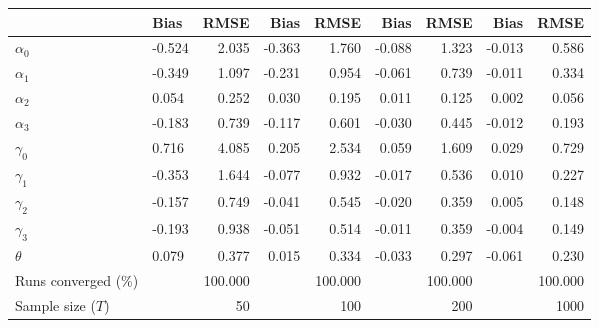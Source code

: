 
\begin{tabular}[t]{llrrrrrrr}
\toprule
  & Bias & RMSE & Bias & RMSE & Bias & RMSE & Bias & RMSE\\
\midrule
$\alpha_{0}$ & -0.524 & 2.035 & -0.363 & 1.760 & -0.088 & 1.323 & -0.013 & 0.586\\
$\alpha_{1}$ & -0.349 & 1.097 & -0.231 & 0.954 & -0.061 & 0.739 & -0.011 & 0.334\\
$\alpha_{2}$ & 0.054 & 0.252 & 0.030 & 0.195 & 0.011 & 0.125 & 0.002 & 0.056\\
$\alpha_{3}$ & -0.183 & 0.739 & -0.117 & 0.601 & -0.030 & 0.445 & -0.012 & 0.193\\
$\gamma_{0}$ & 0.716 & 4.085 & 0.205 & 2.534 & 0.059 & 1.609 & 0.029 & 0.729\\
$\gamma_{1}$ & -0.353 & 1.644 & -0.077 & 0.932 & -0.017 & 0.536 & 0.010 & 0.227\\
$\gamma_{2}$ & -0.157 & 0.749 & -0.041 & 0.545 & -0.020 & 0.359 & 0.005 & 0.148\\
$\gamma_{3}$ & -0.193 & 0.938 & -0.051 & 0.514 & -0.011 & 0.359 & -0.004 & 0.149\\
$\theta$ & 0.079 & 0.377 & 0.015 & 0.334 & -0.033 & 0.297 & -0.061 & 0.230\\
Runs converged (\%) &  & 100.000 &  & 100.000 &  & 100.000 &  & 100.000\\
Sample size ($T$) &  & 50 &  & 100 &  & 200 &  & 1000\\
\bottomrule
\end{tabular}
